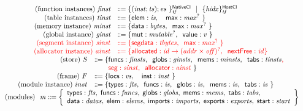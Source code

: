 \documentclass{standalone}
\begin{document}
\[
  \begin{array}{c}
    \begin{array}{rl}
      \text{(function instances)} ~\textit{finst} &\dotdoteq  \NCl{\V{tf}}{(\V{inst};\V{ts})}{\V{es}~}~~|~~\HCl{\V{tf}}{\V{hidx}}
      \\
      \text{(table instances)} ~\textit{tinst} &\dotdoteq \{ \xxfield{elem} : \textit{is}, \quad \xxfield{max} : \V{max^{?}} ~ \}
      \\
      \text{(memory instance)} ~\textit{minst} &\dotdoteq \{ \xxfield{data} : \V{bytes}, \;\;  \xxfield{max} : \V{max^{?}} ~ \} \
      \\
      \text{(global instance)} ~\textit{ginst} &\dotdoteq \{ \xxfield{mut} : \V{mutable^{?}}, \;\;  \xxfield{value} : \V{v} ~ \} \
      \\
      \rr{\text{(segment instance)} ~\V{sinst}} & \rr{\dotdoteq \{ \xxfield{segdata} : \V{tbytes}, \;\; \xxfield{max} : \V{max^{?}} ~ \}} \
      \\
      \rr{\text{(allocator instance)} ~\V{ainst}} & \rr{\dotdoteq \{ \xxfield{allocated} : \V{id}\to(\V{addr}\times\V{off})^?,\;\; \xxfield{nextFree} : \V{id} \}} \
    \end{array}
    \\
    \begin{array}{rl}
      \text{(store)} ~ S  & \dotdoteq  \{  \begin{array}[t]{@{}l@{}} \xxfield{funcs} : \V{finsts}, \;\; \xxfield{globs} : \V{ginsts}, \;\; \xxfield{mems} : \V{minsts}, \;\; \xxfield{tabs} : \V{tinsts}\rr{,} \\
        \rr{\xxfield{seg}:\V{sinst},\;\; \xxfield{allocator}:\V{ainst}} ~ \} \end{array} \
      \\
      \text{(frame)} ~ F &\dotdoteq \{ \xxfield{locs} : \V{vs}, \quad \xxfield{inst} : \V{inst} ~ \}
      \\
      \text{(module instance)} ~ inst &\dotdoteq \{ \xxfield{types} : \V{fts}, \;\;  \xxfield{funcs} : \V{is}, \;\; \xxfield{globs} : \V{is}, \;\; \xxfield{mems} : \V{is}, \;\; \xxfield{tabs} : \V{is} ~ \}
    \end{array}
    \\
    \begin{array}{l}
    \text{(modules)}~~\V{m} \dotdoteq
    \left\{
    \begin{array}{l}
      {\xxfield{types} : \V{fts},\; \xxfield{funcs} : \V{funcs}, \; \xxfield{globs} : \V{globs}, \; \xxfield{mems} : \V{mems}, \; \xxfield{tabs} : \V{tabs},}
      \\
      {\xxfield{data} : \V{datas}, \; \xxfield{elem} : \V{elems}, \; \xxfield{imports} : \V{imports}, \; \xxfield{exports} : \V{exports}, \; \xxfield{start} : \V{start}}
    \end{array}
    \right\}
  \end{array}
  \end{array}
\]
\end{document}
